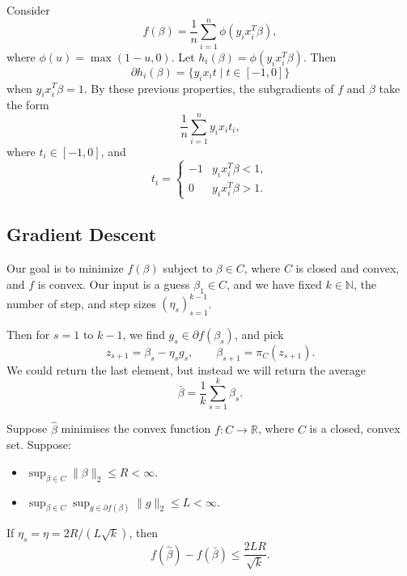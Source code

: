 \documentclass[12pt]{article}
\begin{document}
\begin{exbox}
	Consider
	\[
	f(\beta) = \frac{1}{n} \sum_{i = 1}^n \phi(y_i x_i^T \beta),
	\]
	where $\phi(u) = \max(1 - u, 0)$. Let $h_i(\beta) = \phi(y_i x_i^T \beta)$. Then
	\[
		\partial h_i (\beta) = \{y_i x_i t \mid t \in [-1, 0]\}
	\]
	when $y_i x_i^T \beta = 1$. By these previous properties, the subgradients of $f$ and $\beta$ take the form
	\[
	\frac{1}{n} \sum_{i = 1}^n y_i x_i t_i,
	\]
	where $t_i \in [-1, 0]$, and
	\[
	t_i =
	\begin{cases}
		-1 & y_i x_i^T \beta < 1, \\
		0 & y_i x_i^T \beta > 1.
	\end{cases}
	\]
\end{exbox}

\subsection{Gradient Descent}
\label{sub:grad_d}

Our goal is to minimize $f(\beta)$ subject to $\beta \in C$, where $C$ is closed and convex, and $f$ is convex. Our input is a guess $\beta_1 \in C$, and we have fixed $k \in \mathbb{N}$, the number of step, and step sizes $(\eta_s)_{s = 1}^{k-1}$.

Then for $s = 1$ to $k-1$, we find $g_s \in \partial f(\beta_s)$, and pick
\[
z_{s + 1} = \beta_s - \eta_s g_s, \qquad \beta_{s + 1} = \pi_C(z_{s + 1}).
\]
We could return the last element, but instead we will return the average
\[
\bar \beta = \frac{1}{k} \sum_{s = 1}^k \beta_s.
\]


\begin{theorem}
	Suppose $\hat \beta$ minimises the convex function $f : C \to \mathbb{R}$, where $C$ is a closed, convex set. Suppose:
	\begin{itemize}
		\item $\sup_{\beta \in C} \|\beta\|_2 \leq R < \infty$.
		\item $\sup_{\beta \in C} \sup_{g \in \partial f(\beta)} \|g\|_2 \leq L < \infty$.
	\end{itemize}
	If $\eta_s = \eta = 2R/(L\sqrt{k})$, then
	 \[
	f(\hat \beta) - f (\bar \beta) \leq \frac{2LR}{\sqrt k}.
	\]
\end{theorem}
\end{document}
